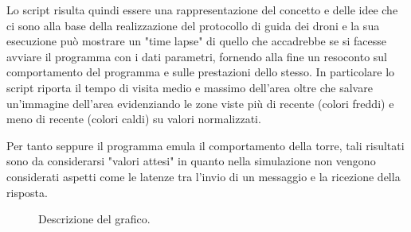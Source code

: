 \documentclass[a4paper, 11pt]{article}
\begin{document}
Lo script risulta quindi essere una rappresentazione del concetto e delle idee che ci sono alla base della realizzazione del protocollo di guida dei droni e la sua esecuzione può mostrare un "time lapse" di quello che accadrebbe se si facesse avviare il programma con i dati parametri, fornendo alla fine un resoconto sul comportamento del programma e sulle prestazioni dello stesso.
In particolare lo script riporta il tempo di visita medio e massimo dell'area oltre che salvare un'immagine dell'area evidenziando le zone viste più di recente (colori freddi) e meno di recente (colori caldi) su valori normalizzati.

Per tanto seppure il programma emula il comportamento della torre, tali risultati sono da considerarsi "valori attesi" in quanto nella simulazione non vengono considerati aspetti come le latenze tra l'invio di un messaggio e la ricezione della risposta.

\begin{figure}
    \centering
    \caption{Descrizione del grafico.}
    \label{fig:my_plot}
\end{figure}
\end{document}
